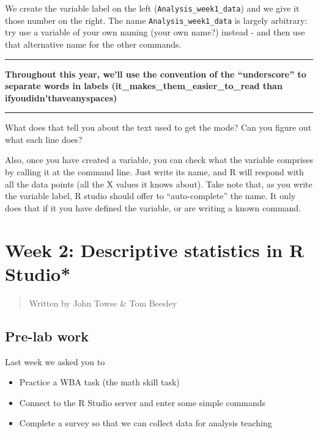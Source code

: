 \documentclass[
]{book}
\providecommand{\tightlist}{%
  \setlength{\itemsep}{0pt}\setlength{\parskip}{0pt}}
\begin{document}
We create the variable label on the left (\texttt{Analysis\_week1\_data}) and we give it those number on the right. The name \texttt{Analysis\_week1\_data} is largely arbitrary: try use a variable of your own naming (your own name?) instead - and then use that alternative name for the other commands.

\begin{center}\rule{0.5\linewidth}{0.5pt}\end{center}

\textbf{Throughout this year, we'll use the convention of the ``underscore'' to separate words in labels (it\_makes\_them\_easier\_to\_read than ifyoudidn'thaveanyspaces)}

\begin{center}\rule{0.5\linewidth}{0.5pt}\end{center}

What does that tell you about the text used to get the mode? Can you figure out what each line does?

Also, once you have created a variable, you can check what the variable comprises by calling it at the command line. Just write its name, and R will respond with all the data points (all the X values it knows about). Take note that, as you write the variable label, R studio should offer to ``auto-complete'' the name. It only does that if it you have defined the variable, or are writing a known command.

\hypertarget{week-2-descriptive-statistics-in-r-studio}{%
\chapter{Week 2: Descriptive statistics in R Studio*}\label{week-2-descriptive-statistics-in-r-studio}}

\begin{quote}
Written by John Towse \& Tom Beesley
\end{quote}

\hypertarget{pre-lab-work}{%
\section{Pre-lab work}\label{pre-lab-work}}

Last week we asked you to

\begin{itemize}
\tightlist
\item
  Practice a WBA task (the math skill task)
\item
  Connect to the R Studio server and enter some simple commands
\item
  Complete a survey so that we can collect data for analysis teaching
\end{itemize}
\end{document}
